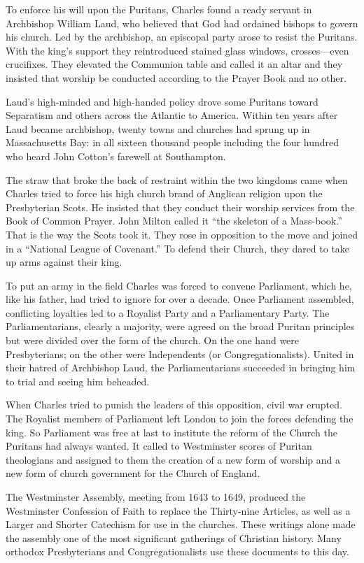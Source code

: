 To enforce his will upon the Puritans, Charles found a ready servant in Archbishop William Laud, who
believed that God had ordained bishops to govern his church. Led by the archbishop, an episcopal
party arose to resist the Puritans. With the king’s support they reintroduced stained glass windows,
crosses—even crucifixes. They elevated the Communion table and called it an altar and they insisted
that worship be conducted according to the Prayer Book and no other.

Laud’s high-minded and high-handed policy drove some Puritans toward Separatism and others across
the Atlantic to America. Within ten years after Laud became archbishop, twenty towns and churches
had sprung up in Massachusetts Bay: in all sixteen thousand people including the four hundred who
heard John Cotton’s farewell at Southampton.

The straw that broke the back of restraint within the two kingdoms came when Charles tried to force
his high church brand of Anglican religion upon the Presbyterian Scots. He insisted that they
conduct their worship services from the Book of Common Prayer. John Milton called it “the skeleton
of a Mass-book.” That is the way the Scots took it. They rose in opposition to the move and joined
in a “National League of Covenant.” To defend their Church, they dared to take up arms against their
king.

To put an army in the field Charles was forced to convene Parliament, which he, like his father, had
tried to ignore for over a decade. Once Parliament assembled, conflicting loyalties led to a
Royalist Party and a Parliamentary Party. The Parliamentarians, clearly a majority, were agreed on
the broad Puritan principles but were divided over the form of the church. On the one hand were
Presbyterians; on the other were Independents (or Congregationalists). United in their hatred of
Archbishop Laud, the Parliamentarians succeeded in bringing him to trial and seeing him beheaded.

When Charles tried to punish the leaders of this opposition, civil war erupted. The Royalist members
of Parliament left London to join the forces defending the king. So Parliament was free at last to
institute the reform of the Church the Puritans had always wanted. It called to Westminster scores
of Puritan theologians and assigned to them the creation of a new form of worship and a new form of
church government for the Church of England.

The Westminster Assembly, meeting from 1643 to 1649, produced the Westminster Confession of Faith to
replace the Thirty-nine Articles, as well as a Larger and Shorter Catechism for use in the churches.
These writings alone made the assembly one of the most significant gatherings of Christian history.
Many orthodox Presbyterians and Congregationalists use these documents to this day.

